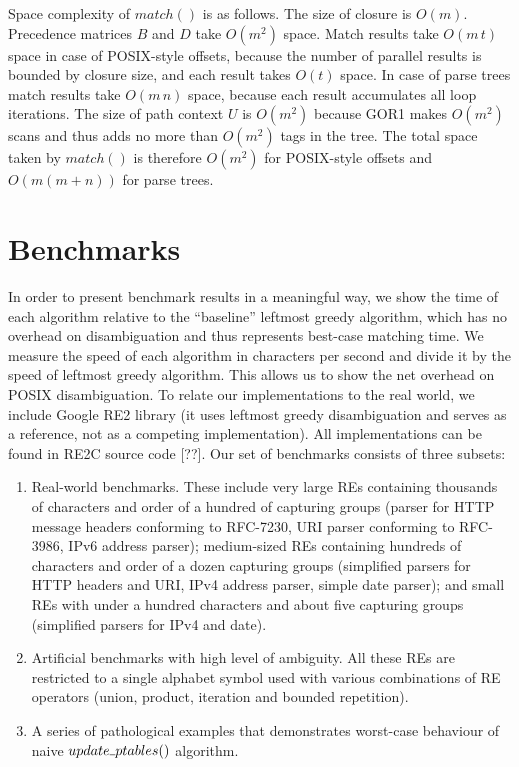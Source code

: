 \documentclass[AMA,STIX1COL]{WileyNJD-v2}
\newcommand{\Xund}{\rule{.4em}{.4pt}}
\begin{document}
Space complexity of $match()$ is as follows.
%
The size of closure is $O(m)$.
%
Precedence matrices $B$ and $D$ take $O(m^2)$ space.
%
Match results take $O(m \, t)$ space in case of POSIX-style offsets,
because the number of parallel results is bounded by closure size,
and each result takes $O(t)$ space.
In case of parse trees match results take $O(m \, n)$ space, because each result accumulates all loop iterations.
%
The size of path context $U$ is $O(m^2)$
because GOR1 makes $O(m^2)$ scans and thus adds no more than $O(m^2)$ tags in the tree.
The total space taken by $match()$ is therefore $O(m^2)$
for POSIX-style offsets and $O(m (m + n))$ for parse trees.


\section{Benchmarks}\label{section_benchmarks}

In order to present benchmark results in a meaningful way,
we show the time of each algorithm relative to the ``baseline'' leftmost greedy algorithm,
which has no overhead on disambiguation and thus represents best-case matching time.
%
We measure the speed of each algorithm in characters per second
and divide it by the speed of leftmost greedy algorithm.
%
This allows us to show the net overhead on POSIX disambiguation.
%
To relate our implementations to the real world,
we include Google RE2 library (it uses leftmost greedy disambiguation and serves as a reference, not as a competing implementation).
%
All implementations can be found in RE2C source code [??].
%
Our set of benchmarks consists of three subsets:
\\[-0.5em]

\begin{enumerate}[itemsep=0.5em]
    \item Real-world benchmarks.
        These include very large REs containing thousands of characters and order of a hundred of capturing groups
        (parser for HTTP message headers conforming to RFC-7230,
        URI parser conforming to RFC-3986,
        IPv6 address parser);
        medium-sized REs containing hundreds of characters and order of a dozen capturing groups
        (simplified parsers for HTTP headers and URI, IPv4 address parser, simple date parser);
        and small REs with under a hundred characters and about five capturing groups
        (simplified parsers for IPv4 and date).

    \item Artificial benchmarks with high level of ambiguity.
        All these REs are restricted to a single alphabet symbol
        used with various combinations of RE operators (union, product, iteration and bounded repetition).

    \item A series of pathological examples that demonstrates worst-case behaviour of naive $update \Xund ptables ()$ algorithm.
    \\[-0.5em]
\end{enumerate}
\end{document}

